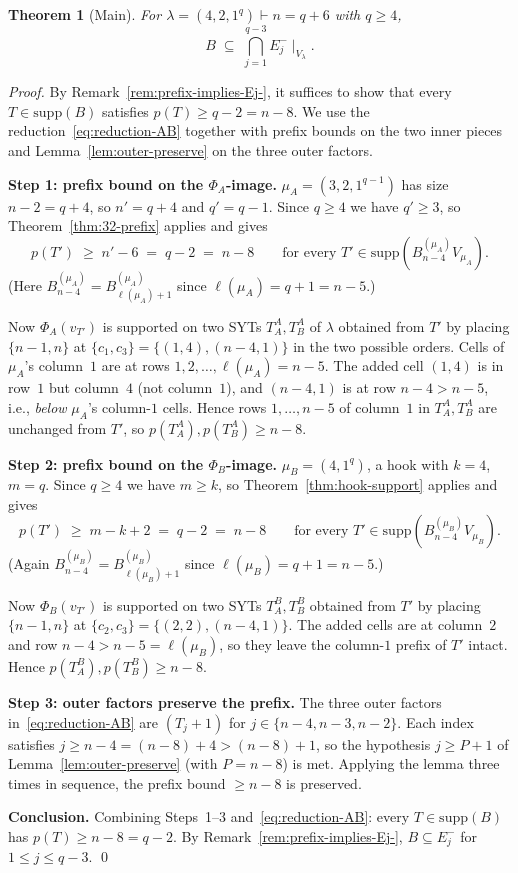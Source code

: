 \documentclass[11pt]{article}
\newtheorem{theorem}{Theorem}
\theoremstyle{definition}
\newcommand{\supp}{\mathrm{supp}}
\begin{document}
\begin{theorem}[Main]\label{thm:main}
For $\lambda = (4, 2, 1^q) \vdash n = q + 6$ with $q \ge 4$,
\[
   B \;\subseteq\; \bigcap_{j=1}^{q-3} E_j^-\!\mid_{V_\lambda}.
\]
\end{theorem}

\begin{proof}
By Remark~\ref{rem:prefix-implies-Ej-}, it suffices to show that
every $T \in \supp(B)$ satisfies $p(T) \ge q - 2 = n - 8$.  We use
the reduction~\eqref{eq:reduction-AB} together with prefix bounds
on the two inner pieces and Lemma~\ref{lem:outer-preserve} on the
three outer factors.

\medskip\textbf{Step 1: prefix bound on the $\Phi_A$-image.}
$\mu_A = (3, 2, 1^{q-1})$ has size $n - 2 = q + 4$, so $n' = q + 4$
and $q' = q - 1$.  Since $q \ge 4$ we have $q' \ge 3$, so
Theorem~\ref{thm:32-prefix} applies and gives
\[
   p(T') \;\ge\; n' - 6 \;=\; q - 2 \;=\; n - 8
   \qquad \text{for every } T' \in \supp(B^{(\mu_A)}_{n-4} V_{\mu_A}).
\]
(Here $B^{(\mu_A)}_{n-4} = B^{(\mu_A)}_{\ell(\mu_A) + 1}$ since
$\ell(\mu_A) = q + 1 = n - 5$.)

Now $\Phi_A(v_{T'})$ is supported on two SYTs $T_A^A, T_B^A$ of
$\lambda$ obtained from $T'$ by placing $\{n-1, n\}$ at $\{c_1, c_3\}
= \{(1, 4), (n-4, 1)\}$ in the two possible orders.  Cells of $\mu_A$'s
column~$1$ are at rows $1, 2, \ldots, \ell(\mu_A) = n - 5$.  The
added cell $(1, 4)$ is in row~$1$ but column~$4$ (not column~$1$),
and $(n-4, 1)$ is at row $n - 4 > n - 5$, i.e., \emph{below} $\mu_A$'s
column-$1$ cells.  Hence rows $1, \ldots, n - 5$ of column~$1$ in
$T_A^A, T_B^A$ are unchanged from $T'$, so
$p(T_A^A), p(T_B^A) \ge n - 8$.

\medskip\textbf{Step 2: prefix bound on the $\Phi_B$-image.}
$\mu_B = (4, 1^q)$, a hook with $k = 4$, $m = q$.  Since $q \ge 4$
we have $m \ge k$, so Theorem~\ref{thm:hook-support} applies and
gives
\[
   p(T') \;\ge\; m - k + 2 \;=\; q - 2 \;=\; n - 8
   \qquad \text{for every } T' \in \supp(B^{(\mu_B)}_{n-4} V_{\mu_B}).
\]
(Again $B^{(\mu_B)}_{n-4} = B^{(\mu_B)}_{\ell(\mu_B)+1}$ since
$\ell(\mu_B) = q + 1 = n - 5$.)

Now $\Phi_B(v_{T'})$ is supported on two SYTs $T_A^B, T_B^B$ obtained
from $T'$ by placing $\{n-1, n\}$ at $\{c_2, c_3\} = \{(2, 2),
(n-4, 1)\}$.  The added cells are at column~$2$ and row $n - 4 >
n - 5 = \ell(\mu_B)$, so they leave the column-$1$ prefix of $T'$
intact.  Hence $p(T_A^B), p(T_B^B) \ge n - 8$.

\medskip\textbf{Step 3: outer factors preserve the prefix.}
The three outer factors in~\eqref{eq:reduction-AB} are $(T_j{+}1)$
for $j \in \{n-4, n-3, n-2\}$.  Each index satisfies $j \ge n - 4 =
(n - 8) + 4 > (n - 8) + 1$, so the hypothesis $j \ge P + 1$ of
Lemma~\ref{lem:outer-preserve} (with $P = n - 8$) is met.  Applying
the lemma three times in sequence, the prefix bound $\ge n - 8$ is
preserved.

\medskip\textbf{Conclusion.}  Combining Steps~1--3 and~\eqref{eq:reduction-AB}:
every $T \in \supp(B)$ has $p(T) \ge n - 8 = q - 2$.  By
Remark~\ref{rem:prefix-implies-Ej-}, $B \subseteq E_j^-$ for $1 \le
j \le q - 3$.
\qed
\end{proof}
\end{document}
